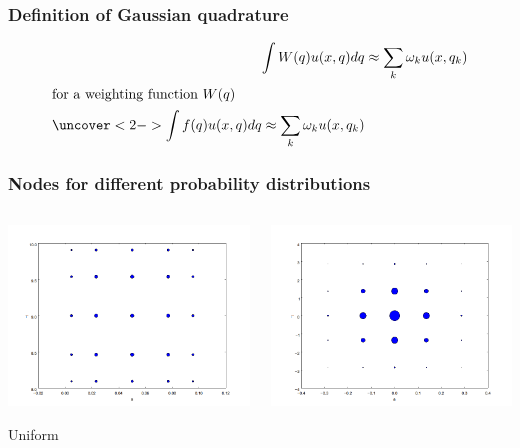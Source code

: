 \documentclass{beamer}
\begin{document}
  
  
 \begin{frame}
  \frametitle{Definition of Gaussian quadrature}
  \begin{align*}
   \int W(q)u(x,q)dq &\approx \sum_k \omega_k u(x,q_k)\\
   \intertext{for a weighting function $W(q)$}
   \uncover<2-> {\int f(q)u(x,q)dq \approx \sum_k \omega_k u(x,q_k)}
    \end{align*}
   \end{frame}

 
  \begin{frame}
 \frametitle{Nodes for different probability distributions}
 \begin{columns}
     \begin{center}
                \includegraphics[width=.7\textwidth]{nodes_uniform.png}

                Uniform
     \end{center}

     \begin{center}
                \includegraphics[width=.7\textwidth]{nodes_normal.png}


\end{center}
\end{columns}
\end{frame}
\end{document}
